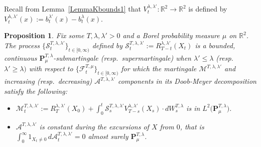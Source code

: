 \documentclass[10pt]{article}
\numberwithin{equation}{section}
\newtheorem{proposition}[theorem]{Proposition}
\theoremstyle{definition}
\newcommand{\R}{{\mathbb R}}
\begin{document}
Recall from Lemma~\ref{LemmaKbounds1} that  $ V^{\lambda ,\lambda'}_{t}:\R^2\rightarrow \R^2 $  is defined by
$ V^{\lambda, \lambda'}_{t }(x):=  b_t^{\lambda'}(x) -  b_t^{\lambda}(x) $.
\begin{proposition}\label{PropSubMartII} Fix some  $T,\lambda, \lambda'>0$  and  a Borel probability    measure $\mu$ on $\R^2$.    The process $\{\mathcal{S}_{t}^{T,\lambda,\lambda'}\}_{t\in [0,\infty)}$  defined by $\mathcal{S}_{t}^{T,\lambda,\lambda'}:=R^{\lambda,\lambda'}_{T-t}(X_t)$ is a bounded, continuous $\mathbf{P}_{\mu}^{T,\lambda}   $-submartingale (resp.\ supermartingale) when $\lambda'\leq \lambda$ (resp.\ $\lambda' \geq \lambda)$ with respect to $\{\mathscr{F}_t^{T,\mu }\}_{t\in [0,\infty)}$ 
 for which the martingale $\mathcal{M}^{T, \lambda,\lambda'}$ and increasing (resp.\ decreasing) $\mathcal{A}^{T, \lambda,\lambda'}$ components in its Doob-Meyer decomposition satisfy the following:
\begin{itemize}
    \item  
$ \mathcal{M}_{t }^{T, \lambda,\lambda'}:=R^{\lambda,\lambda'}_{T}(X_0) +\int_0^t\mathcal{S}_{s }^{T, \lambda,\lambda'}V^{\lambda, \lambda'}_{T-s }(X_s)
\cdot dW_{s}^{T,\lambda} $ is in $L^2\big( \mathbf{P}_{\mu}^{T,\lambda}  \big)$.

    \item $\mathcal{A}^{T, \lambda,\lambda'}$ is constant during the excursions of $X$  from $0$, that is  $\int_0^\infty 1_{ X_t\neq 0 }\, d\mathcal{A}_{t }^{T, \lambda,\lambda'} =0 $ almost surely $\mathbf{P}_{\mu}^{T,\lambda}   $.



    
\end{itemize}

\end{proposition}
\end{document}
